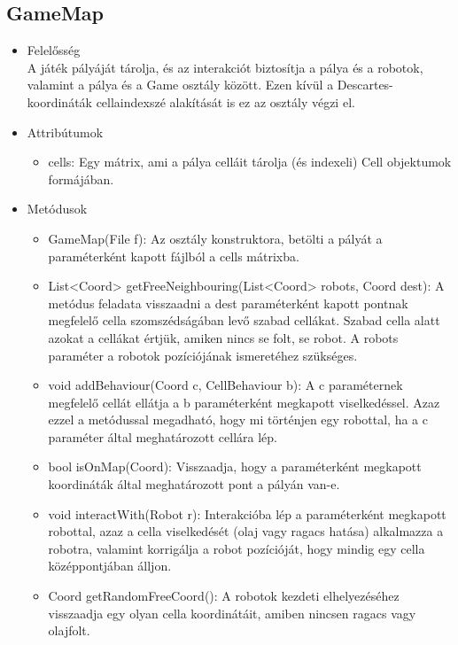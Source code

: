 \subsection{GameMap}
\begin{itemize}
	\item Felelősség\\
	A játék pályáját tárolja, és az interakciót biztosítja a pálya és a robotok, valamint a pálya és a Game osztály között. Ezen kívül a Descartes-koordináták cellaindexszé alakítását is ez az osztály végzi el.
	\item Attribútumok
	\begin{itemize}
		\item cells: Egy mátrix, ami a pálya celláit tárolja (és indexeli) Cell objektumok formájában.
	\end{itemize}
	\item Metódusok
	\begin{itemize}
		\item GameMap(File f): Az osztály konstruktora, betölti a pályát a paraméterként kapott fájlból a cells mátrixba.
		\item List<Coord> getFreeNeighbouring(List<Coord> robots, Coord dest): A metódus feladata visszaadni a dest paraméterként kapott pontnak megfelelő cella szomszédságában levő szabad cellákat. Szabad cella alatt azokat a cellákat értjük, amiken nincs se folt, se robot. A robots paraméter a robotok pozíciójának ismeretéhez szükséges.
		\item void addBehaviour(Coord c, CellBehaviour b): A c paraméternek megfelelő cellát ellátja a b paraméterként megkapott viselkedéssel. Azaz ezzel a metódussal megadható, hogy mi történjen egy robottal, ha a c paraméter által meghatározott cellára lép.
		\item bool isOnMap(Coord): Visszaadja, hogy a paraméterként megkapott koordináták által meghatározott pont a pályán van-e.
		\item void interactWith(Robot r): Interakcióba lép a paraméterként megkapott robottal, azaz a cella viselkedését (olaj vagy ragacs hatása) alkalmazza a robotra, valamint korrigálja a robot pozícióját, hogy mindig egy cella középpontjában álljon.
		\item Coord getRandomFreeCoord(): A robotok kezdeti elhelyezéséhez visszaadja egy olyan cella koordinátáit, amiben nincsen ragacs vagy olajfolt.
	\end{itemize}
\end{itemize}


